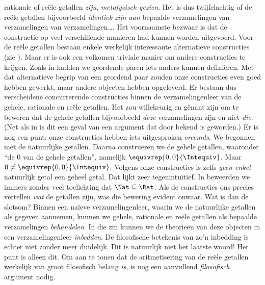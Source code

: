 \documentclass[openany]{memoir}
\begin{document}
rationale of reële getallen \emph{zijn}, \emph{metafysisch gezien}.
Het is dus twijfelachtig of de reële getallen bijvoorbeeld
\emph{identiek zijn aan} bepaalde verzamelingen van verzamelingen van
verzamelingen\ldots.
Het voornaamste bezwaar is dat de constructie op veel verschillende
manieren had kunnen worden uitgevoerd. Voor de reële getallen bestaan
enkele werkelijk interessante alternatieve constructies (zie
). Maar er is ook een volkomen triviale manier om
andere constructies te krijgen. Zoals in
 hadden we geordende paren iets anders kunnen
definiëren. Met dat alternatieve begrip van een geordend paar zouden
onze constructies even goed hebben gewerkt, maar andere objecten hebben
opgeleverd. Er bestaan dus verscheidene concurrerende constructies
binnen de verzamelingenleer van de gehele, rationale en reële
getallen. Het zou willekeurig en gênant zijn om te beweren dat de
gehele getallen bijvoorbeeld \emph{deze} verzamelingen zijn en niet
\emph{die}. (Net als in  is dit een geval van
een argument dat door \citealt{Benacerraf1965} bekend is geworden.)
Er is nog een punt: onze constructies hebben iets uitgesproken
\emph{vreemds}. We begonnen met de natuurlijke getallen. Daarna
construeren we de gehele getallen, waaronder ``de $0$ van de gehele
getallen'', namelijk $ \equivrep{0,0}{\Intequiv}$. Maar $0 \neq
\equivrep{0,0}{\Intequiv}$. Volgens onze constructies is zelfs
\emph{geen enkel} natuurlijk getal een geheel getal. Dat lijkt zeer
tegenintuïtief. In  beweerden we immers
zonder veel toelichting dat $\Nat \subseteq \Rat$. Als de constructies
ons precies vertellen \emph{wat} de getallen zijn, was die bewering
evident onwaar.
Wat is dan de slotsom? Binnen een na\"ieve verzamelingenleer, waarin we
de natuurlijke getallen als gegeven aannemen, kunnen we gehele,
rationale en reële getallen als bepaalde verzamelingen
\emph{behandelen}. In die zin kunnen we de theorieën van deze objecten
in een verzamelingenleer \emph{inbedden}. De filosofische betekenis van
zo'n inbedding is echter niet zonder meer duidelijk.
Dit is natuurlijk niet het laatste woord!{} Het punt is alleen dit. Om
aan te tonen dat de aritmetisering van de reële getallen werkelijk van
groot filosofisch belang \emph{is}, is nog een aanvullend
\emph{filosofisch} argument nodig.
\endgroup
\end{document}
